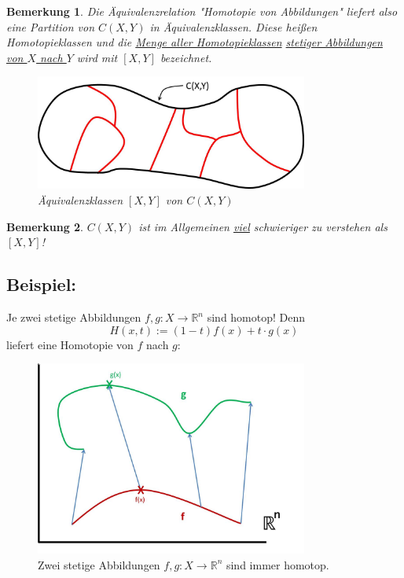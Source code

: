 \documentclass[a4paper,11pt,notitlepage]{report}
\newtheorem{remark}{Bemerkung}[chapter]
\newcommand{\R}{{\ensuremath{\mathbb{R}}}}
\newenvironment{bsp}[1]
{
\setlength{\fboxsep}{10pt}
\subsection*{Beispiel: #1}
\begin{upshape}
}
{
\end{upshape}
}
\begin{document}
\begin{remark}
Die Äquivalenzrelation "Homotopie von Abbildungen" liefert also eine Partition von $C(X,Y)$ in Äquivalenzklassen. Diese heißen Homotopieklassen und die \underline{Menge aller Homotopieklassen} \underline{stetiger Abbildungen} \underline{von $X$ nach $Y$} wird mit $[X,Y]$ bezeichnet.
\begin{figure}[h]
\centering
\includegraphics[width=0.8\textwidth]{images/Aequivalenzklassen.jpg}
\caption{Äquivalenzklassen $[X,Y]$ von $C(X,Y)$}
\end{figure}
\end{remark}

\begin{remark}
$C(X,Y)$ ist im Allgemeinen \underline{\underline{viel}} schwieriger zu verstehen als $[X,Y]$!
\end{remark}

\begin{bsp}{}
Je zwei stetige Abbildungen $f,g \colon X \rightarrow \R^n$ sind homotop! Denn 
$$H(x,t):= (1-t) f(x) + t \cdot g(x)$$ liefert eine Homotopie von $f$ nach $g$:
\begin{figure}[h]
\centering
\includegraphics[width=0.8\textwidth]{images/R_n_immer_homotop.jpg}
\caption{Zwei stetige Abbildungen $f,g \colon X \rightarrow \R^n$ sind immer homotop.}
\end{figure} 
\end{bsp}
\end{document}
